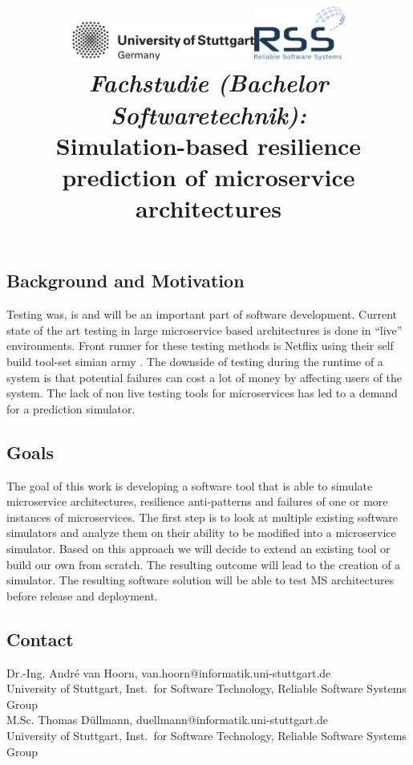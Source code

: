 \documentclass[a4paper,12pt]{article}
\date{}
\title{
\includegraphics[width=6cm]{figures/stuttgart-vector.pdf}\hfill{\includegraphics[width=3cm]{figures/rss_logo.pdf}}
\quad \\ [0.5cm]
{\large \textit{Fachstudie (Bachelor Softwaretechnik):}} \\ [1mm]
{\Large Simulation-based resilience prediction of microservice architectures}
}
\begin{document}
	

\maketitle

\thispagestyle{empty}

\vspace{-2.5cm}


\subsection*{Background and Motivation}
	Testing was, is and will be an important part of software development. Current state of the art testing in large microservice based architectures is done in “live” environments. Front runner for these testing methods is Netflix using their self build tool-set simian army \cite{NSA}. The downside of testing during the runtime of a system is that potential failures can cost a lot of money by affecting users of the system. The lack of non live testing tools for microservices has led to a demand for a prediction simulator.


\subsection*{Goals}
	The goal of this work is developing a software tool that is able to simulate microservice architectures, resilience anti-patterns and failures of one or more instances of microservices. The first step is to look at multiple existing software simulators and analyze them on their ability to be modified into a microservice simulator. Based on this approach we will decide to extend an existing tool or build our own from scratch. The resulting outcome will lead to the creation of a simulator. The resulting software solution will be able to test MS architectures before release and deployment.

\begin{scriptsize}


\end{scriptsize}

\subsection*{Contact}
Dr.-Ing. André van Hoorn, van.hoorn@informatik.uni-stuttgart.de \\
University of Stuttgart, Inst.\ for Software Technology, Reliable Software Systems Group \\ \newline
M.Sc. Thomas Düllmann, duellmann@informatik.uni-stuttgart.de \\
University of Stuttgart, Inst.\ for Software Technology, Reliable Software Systems Group \\
\end{document}
